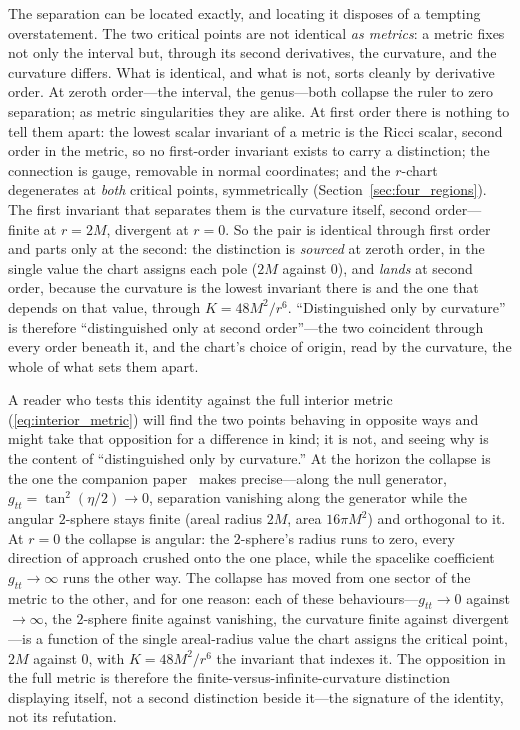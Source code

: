\documentclass[11pt,a4paper]{article}
\theoremstyle{definition}
\begin{document}
The separation can be located exactly, and locating it disposes of a tempting overstatement. The two critical points are not identical \emph{as metrics}: a metric fixes not only the interval but, through its second derivatives, the curvature, and the curvature differs. What is identical, and what is not, sorts cleanly by derivative order. At zeroth order---the interval, the genus---both collapse the ruler to zero separation; as metric singularities they are alike. At first order there is nothing to tell them apart: the lowest scalar invariant of a metric is the Ricci scalar, second order in the metric, so no first-order invariant exists to carry a distinction; the connection is gauge, removable in normal coordinates; and the $r$-chart degenerates at \emph{both} critical points, symmetrically (Section~\ref{sec:four_regions}). The first invariant that separates them is the curvature itself, second order---finite at $r=2M$, divergent at $r=0$. So the pair is identical through first order and parts only at the second: the distinction is \emph{sourced} at zeroth order, in the single value the chart assigns each pole ($2M$ against $0$), and \emph{lands} at second order, because the curvature is the lowest invariant there is and the one that depends on that value, through $K = 48M^2/r^6$. ``Distinguished only by curvature'' is therefore ``distinguished only at second order''---the two coincident through every order beneath it, and the chart's choice of origin, read by the curvature, the whole of what sets them apart.

A reader who tests this identity against the full interior metric (\ref{eq:interior_metric}) will find the two points behaving in opposite ways and might take that opposition for a difference in kind; it is not, and seeing why is the content of ``distinguished only by curvature.'' At the horizon the collapse is the one the companion paper~\cite{JanzenBHcausality} makes precise---along the null generator, $g_{tt}=\tan^2(\eta/2)\to0$, separation vanishing along the generator while the angular $2$-sphere stays finite (areal radius $2M$, area $16\pi M^2$) and orthogonal to it. At $r=0$ the collapse is angular: the $2$-sphere's radius runs to zero, every direction of approach crushed onto the one place, while the spacelike coefficient $g_{tt}\to\infty$ runs the other way. The collapse has moved from one sector of the metric to the other, and for one reason: each of these behaviours---$g_{tt}\to0$ against $\to\infty$, the $2$-sphere finite against vanishing, the curvature finite against divergent---is a function of the single areal-radius value the chart assigns the critical point, $2M$ against $0$, with $K=48M^2/r^6$ the invariant that indexes it. The opposition in the full metric is therefore the finite-versus-infinite-curvature distinction displaying itself, not a second distinction beside it---the signature of the identity, not its refutation.
\end{document}
